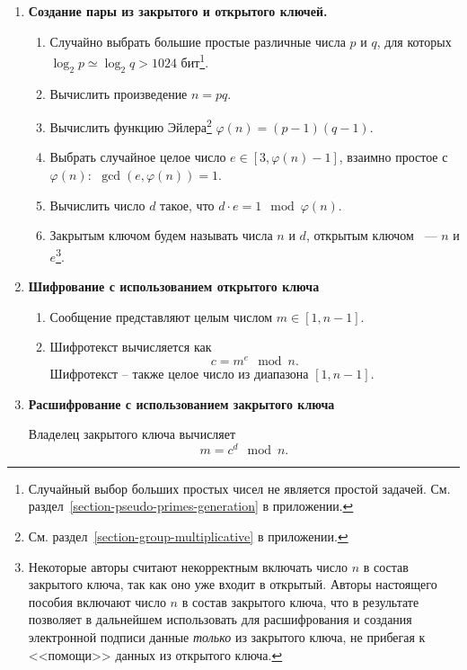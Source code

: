 \begin{enumerate}
    \item \textbf{Создание пары из закрытого и открытого ключей.}
        \begin{enumerate}
            \item Случайно выбрать большие простые различные числа $p$ и $q$, для которых $\log_2 p \simeq \log_2 q > 1024$ бит\footnote{Случайный выбор больших простых чисел не является простой задачей. См. раздел~\ref{section-pseudo-primes-generation} в приложении.}.
            \item Вычислить произведение $n = pq$.
            \item Вычислить функцию Эйлера\footnote{См. раздел~\ref{section-group-multiplicative} в приложении.} $\varphi(n) = (p-1)(q-1)$.
            \item Выбрать случайное целое число $e \in [3, \varphi(n)-1]$, взаимно простое с $\varphi(n)$: $~ \gcd(e, \varphi(n)) = 1$.
            \item Вычислить число $d$ такое, что $d \cdot e = 1 \mod \varphi(n)$.
            \item Закрытым ключом будем называть числа $n$ и $d$, открытым ключом ~--- $n$ и $e$\footnote{Некоторые авторы считают некорректным включать число $n$ в состав закрытого ключа, так как оно уже входит в открытый. Авторы настоящего пособия включают число $n$ в состав закрытого ключа, что в результате позволяет в дальнейшем использовать для расшифрования и создания электронной подписи данные \emph{только} из закрытого ключа, не прибегая к <<помощи>> данных из открытого ключа.}.
        \end{enumerate}

    \item \textbf{Шифрование с использованием открытого ключа}
        \begin{enumerate}
            \item Сообщение представляют целым числом $m \in [1, n-1]$.
            \item Шифротекст вычисляется как
                \[ c = m^e \mod n. \]
                Шифротекст -- также целое число из диапазона $[1, n-1]$.
        \end{enumerate}
    \item \textbf{Расшифрование с использованием закрытого ключа}

        Владелец закрытого ключа вычисляет
                \[ m = c^d \mod n. \]
\end{enumerate}

